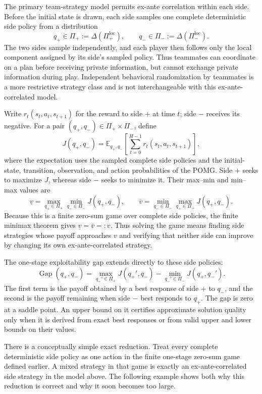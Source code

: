 The primary team-strategy model permits ex-ante correlation within each side. Before the initial state is drawn, each side samples one complete deterministic side policy from a distribution
\[
    q_+\in\Pi_+:=\Delta(\Pi^{\mathrm{loc}}_+),
    \qquad
    q_-\in\Pi_-:=\Delta(\Pi^{\mathrm{loc}}_-).
\]
The two sides sample independently, and each player then follows only the local component assigned by its side's sampled policy. Thus teammates can coordinate on a plan before receiving private information, but cannot exchange private information during play. Independent behavioral randomization by teammates is a more restrictive strategy class and is not interchangeable with this ex-ante-correlated model.

Write $r_t(s_t,a_t,s_{t+1})$ for the reward to side $+$ at time $t$; side $-$ receives its negative. For a pair $(q_+,q_-)\in\Pi_+\times\Pi_-$, define
\begin{equation}
\label{eq:pomg-objective}
    J(q_+,q_-)
    =
    \mathbb{E}_{q_+,q_-}
    \left[
      \sum_{t=0}^{H-1}
      r_t(s_t,a_t,s_{t+1})
    \right],
\end{equation}
where the expectation uses the sampled complete side policies and the initial-state, transition, observation, and action probabilities of the POMG. Side $+$ seeks to maximize $J$, whereas side $-$ seeks to minimize it. Their max--min and min--max values are
\[
    \underline v
    =
    \max_{q_+\in\Pi_+}
    \min_{q_-\in\Pi_-}
    J(q_+,q_-),
    \qquad
    \overline v
    =
    \min_{q_-\in\Pi_-}
    \max_{q_+\in\Pi_+}
    J(q_+,q_-).
\]
Because this is a finite zero-sum game over complete side policies, the finite minimax theorem gives $\underline v=\overline v=:v$. Thus solving the game means finding side strategies whose payoff approaches $v$ and verifying that neither side can improve by changing its own ex-ante-correlated strategy.

The one-stage exploitability gap extends directly to these side policies:
\[
    \operatorname{Gap}(q_+,q_-)
    =
    \max_{q_+'\in\Pi_+}
    J(q_+',q_-)
    -
    \min_{q_-'\in\Pi_-}
    J(q_+,q_-').
\]
The first term is the payoff obtained by a best response of side $+$ to $q_-$, and the second is the payoff remaining when side $-$ best responds to $q_+$. The gap is zero at a saddle point. An upper bound on it certifies approximate solution quality only when it is derived from exact best responses or from valid upper and lower bounds on their values.

There is a conceptually simple exact reduction. Treat every complete deterministic side policy as one action in the finite one-stage zero-sum game defined earlier. A mixed strategy in that game is exactly an ex-ante-correlated side strategy in the model above. The following example shows both why this reduction is correct and why it soon becomes too large.

